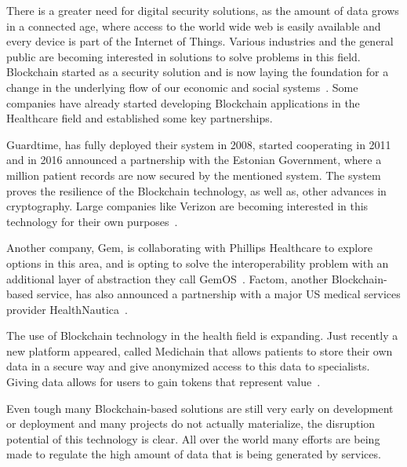 There is a greater need for digital security solutions, as the amount of data
grows in a connected age, where access to the world wide web is easily
available and every device is part of the Internet of Things. Various
industries and the general public are becoming interested in solutions to solve
problems in this field. Blockchain started as a security solution and is now
laying the foundation for a change in the underlying flow of our economic and
social systems~\cite{Zago2018,Marr2018,Long2018}. Some companies have already
started developing Blockchain applications in the Healthcare field and
established some key partnerships.

Guardtime, has fully deployed their system in 2008, started cooperating in 2011
and in 2016 announced a partnership with the Estonian Government, where a
million patient records are now secured by the mentioned system. The system
proves the resilience of the Blockchain technology, as well as, other advances
in cryptography. Large companies like Verizon are becoming interested in this
technology for their own
purposes~\cite{GuardTime2018,EstonianGovernmentGuardTime2016}.

Another company, Gem, is collaborating with Phillips Healthcare to explore
options in this area\cite{philips2016}, and is opting to solve the
interoperability problem with an additional layer of abstraction they call
GemOS~\cite{gemOS2018}. Factom, another Blockchain-based service, has also
announced a partnership with a major US medical services provider
HealthNautica~\cite{BlockchainCompHealth2017,FactomPartnership2017}.

The use of Blockchain technology in the health field is expanding. Just
recently a new platform appeared, called Medichain that allows patients to
store their own data in a secure way and give anonymized access to this data to
specialists. Giving data allows for users to gain tokens that represent
value~\cite{MediChain2018}.

Even tough many Blockchain-based solutions are still very early on development
or deployment and many projects do not actually materialize, the disruption
potential of this technology is clear. All over the world many efforts are
being made to regulate the high amount of data that is being generated by
services.

